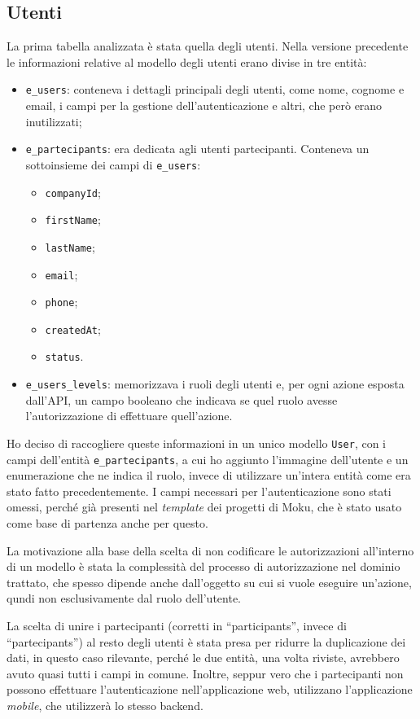 \subsection{Utenti}
La prima tabella analizzata è stata quella degli utenti. Nella versione precedente le informazioni relative al modello degli utenti erano divise in tre entità:
\begin{itemize}
	\item \verb|e_users|: conteneva i dettagli principali degli utenti, come nome, cognome e email, i campi per la gestione dell'autenticazione e altri, che però erano inutilizzati;
	\item \verb|e_partecipants|: era dedicata agli utenti partecipanti. Conteneva un sottoinsieme dei campi di \verb|e_users|:
	\begin{itemize}
		\item \verb|companyId|;
		\item \verb|firstName|;
		\item \verb|lastName|;
		\item \verb|email|;
		\item \verb|phone|;
		\item \verb|createdAt|;
		\item \verb|status|.
	\end{itemize}
	\item \verb|e_users_levels|: memorizzava i ruoli degli utenti e, per ogni azione esposta dall'API, un campo booleano che indicava se quel ruolo avesse l'autorizzazione di effettuare quell'azione.
\end{itemize}
Ho deciso di raccogliere queste informazioni in un unico modello \verb|User|, con i campi dell'entità \verb|e_partecipants|, a cui ho aggiunto l'immagine dell'utente e un enumerazione che ne indica il ruolo, invece di utilizzare un'intera entità come era stato fatto precedentemente. I campi necessari per l'autenticazione sono stati omessi, perché già presenti nel \emph{template} dei progetti di Moku, che è stato usato come base di partenza anche per questo.

La motivazione alla base della scelta di non codificare le autorizzazioni all'interno di un modello è stata la complessità del processo di autorizzazione nel dominio trattato, che spesso dipende anche dall'oggetto su cui si vuole eseguire un'azione, qundi non esclusivamente dal ruolo dell'utente.

La scelta di unire i partecipanti (corretti in ``participants'', invece di ``partecipants'') al resto degli utenti è stata presa per ridurre la duplicazione dei dati, in questo caso rilevante, perché le due entità, una volta riviste, avrebbero avuto quasi tutti i campi in comune. Inoltre, seppur vero che i partecipanti non possono effettuare l'autenticazione nell'applicazione web, utilizzano l'applicazione \emph{mobile}, che utilizzerà lo stesso backend.


